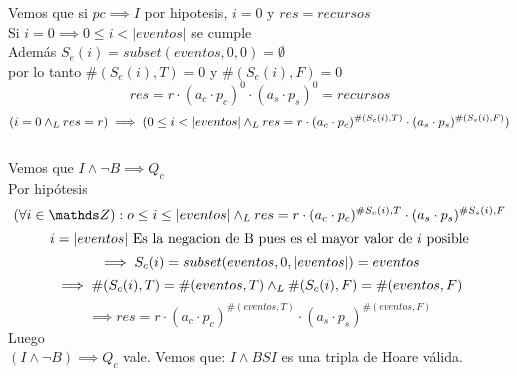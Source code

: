 \documentclass[document.tex]{subfiles}
\begin{document}
Vemos que si $pc\implies I$ por hipotesis, $i=0$ y $res=recursos$\\
Si $i=0 \implies 0\leq i < |eventos|$ se cumple\\
Además $S_e(i)=subset(eventos,0,0)=\emptyset$\\
por lo tanto $\#(S_e(i),T)=0$ y $\#(S_e(i),F)=0$
\begin{equation}
res=r\cdot(a_c\cdot p_c)^0\cdot (a_s\cdot p_s)^0=recursos
\end{equation}
\begin{equation}
(i=0 \land _L res=r)\implies (0\leq i < |eventos| \land _L res=r\cdot(a_c\cdot p_c)^{\#(S_c(i),T)}\cdot(a_s\cdot p_s)^{\#(S_s(i),F)})
\end{equation}\\
Vemos que $I\land ¬B \implies Q_c$\\
Por hipótesis\\
\begin{equation}
(\forall i \in \ent):o \leq i \leq |eventos| \yLuego res=r\cdot (a_c\cdot p_c)^{\#S_c(i),T}\cdot (a_s\cdot p_s)^{\#S_s(i),F}
\end{equation}
\begin{equation}
i=|eventos| \text{ Es la negacion de B pues es el mayor valor de $i$ posible\\}
\end{equation}
\begin{equation}
\implies S_c(i)=subset(eventos, 0, |eventos|)=eventos\\
\end{equation}
\begin{equation}
\implies \#(S_c(i),T)=\#(eventos,T)\land _L \#(S_c(i),F)=\#(eventos,F)\\
\end{equation}
\begin{equation}
\implies res=r\cdot (a_c\cdot p_c)^{\#(eventos,T)}\cdot (a_s\cdot p_s)^{\#(eventos,F)}
\end{equation}
Luego\\
$(I\land¬B)\implies Q_c$ vale.
Vemos que:
${I\land B} S {I}$	es una tripla de Hoare válida.
\end{document}
